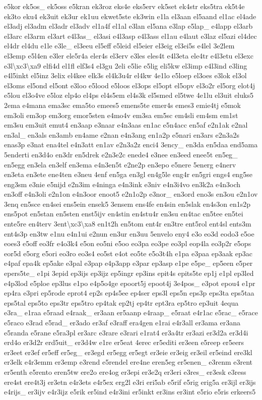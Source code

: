 \begin{DoxyCompactItemize}
e5kor ek5os\-\_\- ek5oss e5kran ek3roz eks4e eks5erv ek5set ek4str eks5tra ek5t4e ek3to eku4 ek3uit ek3ur ek1uu ekwet5ste ek3win e1la el3aan el5aand el1ac el4ade el3adj el3adm el3adr el3adv el1a4f el1al e3lan el5ana e3lap e5lap\-\_\- e4lapp el3arb el3arc el3arm el3art e4l3as\-\_\- el3asi e4l3asp e4l3ass el1au e4laut e3laz el5azi el4dec el4dr el4du e1le e3le\-\_\- el3eeu el5eff e5leid el5eier el3eig el3ei5s e4lel 3e2lem el3emp e5l4en e3ler ele5r4a eler4s el3erv e3les eles4t e4l3eta ele4tr e4l3etu el3exc e3l\textbackslash{}xc3\textbackslash{}xa9 elfi4d el1fl elf3s4 el3gu 2eli e5lie e5lig eli5kw el3imp e4l3ind e3ling e4l5inkt el5inz 3elix el4kee elk3s el4k3u4r el4kw 4e1lo e5loep el3oes e3lok el3ol el3oms el5ond el5ont e3loo e5lood e5loos el3ops el5opt el5opv el3o2r el5org elot4j e5lou el3o4ve e5loz elp4o el4ps el4s5em el4s3k el5smed el5twe 4e1lu el3uit eluks5 2ema e4mana ema3sc ema5to emees5 emens5te emer4s emes3 emie4tj e5mok em3oli em3op em3org emor5sten e4mo4v em3sa em5sc em4sli em4sm em1st em3su em3uit emut4 en3aap e3naar e4n3aas en1ac e5n4acc en5af e2n1ak e2nal en3al\-\_\- en3als en3amb en4ame e2nan e4n3ang en1a2p e5nari en3ars e2n3a2s enas3p e3nat ena4tel e4n3att en1av e2n3a2z enci4 3ency\-\_\- en3da en5daa end5ama 5enderti en3d4o en3dr en5drek e2n3e2c enede4 e3nee en3eed enee5t en5eg\-\_\- en5egg en3ela en3elf en3ema e4n3en5t e2ne2p en3epo e5nere 5energ e4nerv en3eta en3ete ene4ten e3neu 4enf en5ga en3gl en4g5le eng4r en5gri engs4 eng5se eng3sm e3nie e5nijd e2n3im e4ninga e4n3ink e3niv e4n3i4vo en3k2a e4n3och en3off e4n3oli e2n1on e4n3oor enoot5 e2n1o2p e3nor\-\_\- en3ord eno3s en3ou e2n1ov 3enq en5sce en4sei ens5ein ensek5 3ensem ens4fe en4sin en5slak en4s3on en1s2p ens5pot en5stan en5sten enst5ijv en4stin en4stu4r en3su en4tac en5tee en5tei ente5re en4terv 3ent\textbackslash{}xc3\textbackslash{}xa8 en1t2h en5tom ent4r en3tre ent5rol ent4sl ents3m ent4s3p en3tw e1nu e4n1ui e2nun en3ur en3uu 5envelo eny4 e3o eo3d eodo3 e5oe eoes3 e5off eo3fr e4o3k4 e5on eo5ni e5oo eo3pa eo3pe eo3pl eop4la eo3p2r e5ops eor5d e5org e5ori eo3ro eo3s4 eo5st e4ot eo5te e5o3t4h e1pa e3paa ep3aak ep3ac e4paf epa4k ep5ake e3pal e3pap e4p3app e3par ep3asp e1pe e5pe\-\_\- ep5een e5per epers5te\-\_\- e1pi 3epid ep3ijs ep3ijz ep5ingr ep3ins epit4s epits5te ep1j e1pl ep3led e4p3lod e5ploe ep3lus e1po e4p5o4ge epoort5j epoot4j 3e4pos\-\_\- e3pot epou4 e1pr ep4ra e3pri ep5rode eprot4 ep2s ep4s5ee ep4ser eps3l eps5n eps3p eps3ta eps5taa eps5tal eps5to eps3tr eps5tro ep4tak ep2tj ep4tr ept3ra ep5tro ep3uit 4equa e3ra\-\_\- e1raa e5raad e4raak\-\_\- er3aan er5aanp e4raap\-\_\- e5raat e4r1ac e5rac\-\_\- e5race e5raco e3rad e5rad\-\_\- er3ado er3af e3raff era4gen e1rai e4r3all er3ama er3ana e5randa e5rane e5ra3pl er3arc e3rare e3rari e1rat4 er3a4tr er3azi er3d2a er3d4i erd4o er3d2r erd5uit\-\_\- er3d4w e1re er5eat 4erec er5editi er3een e5reep er5eers er3eet er3ef er5eff er5eg\-\_\- er3egd er5egg er5egt er3eie er3eig er3eil er5eind ere3kl er3elk e4r3emm er3emp e3rend e5rendel ere4ne eren5eg er5enen\-\_\- e3renm e3rent er5enth e5rento eren5tw ere2o ere4og er3epi er3e2q er3eri e3res\-\_\- er3esk e3ress ere4st ere4t3j er3etn e4r3ets e4r5ex erg2l e3ri eri5ab e5rif e5rig erig5a er3ijl er3ijs e4rijs\-\_\- er3ijv e4r3ijz e5rik er5ind e4r3ini er5inkt er3ins er3int e5rio e5ris erkeers5 
\end{DoxyCompactItemize}
